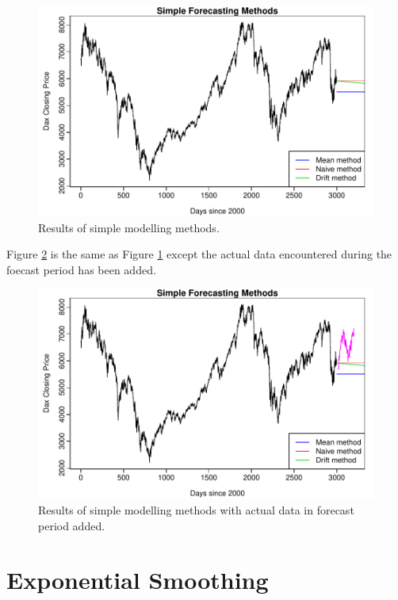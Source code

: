 \begin{figure}[tbh]
\centering
\includegraphics{Figures/chp_ts_dax1}
\caption[Results of simple modelling methods.]{Results of simple modelling methods.}
\label{fig:chp5_ts_dax}
\end{figure}

Figure \ref{fig:chp_ts_dax_act} is the same as Figure \ref{fig:chp5_ts_dax} except the actual data encountered during the foecast period has been added.

\begin{figure}[tbh]
\centering
\includegraphics{Figures/chp_ts_dax1_plus_act_data}
\caption[Results of simple modelling methods and actual data.]{Results of simple modelling methods with actual data in forecast period added.}
\label{fig:chp_ts_dax_act}
\end{figure}

\section{Exponential Smoothing}

